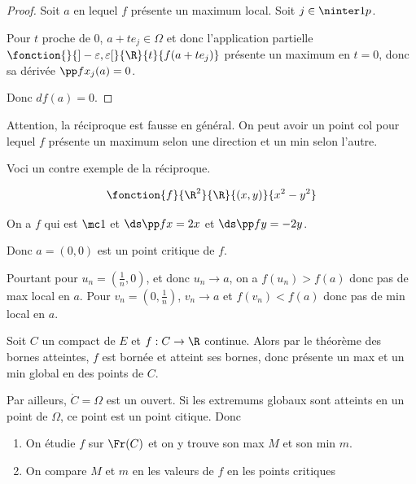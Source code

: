 \begin{proof}
    Soit $a$ en lequel $f$ présente un maximum local. Soit $j \in \ninter 1 p$. 

    Pour $t$ proche de 0, $a + t e_j \in \Omega$ et donc l'application
    partielle $\fonction{}{]- \varepsilon, \varepsilon[}{\R}{t}{f(a + t e_j)}$ présente un maximum en $t = 0$, donc
    sa dérivée $\pp f {x_j} (a) = 0$.

    Donc $df(a) = 0$.
\end{proof}

Attention, la réciproque est fausse en général. On peut avoir un point col pour 
lequel $f$ présente un maximum selon une direction et un min selon l'autre. 


\begin{exemple}
    Voci un contre exemple de la réciproque. 

    $$\fonction{f}{\R^2}{\R}{(x, y)}{x^2 - y^2}$$
    
    On a $f$ qui est $\mc 1$ et 
    $\ds \pp f x = 2x$ et $\ds \pp f y = -2y$.

    Donc $a = (0, 0)$ est un point critique de $f$.

    Pourtant pour $u_n = \left( \frac 1 n, 0 \right)$, et donc $u_n \to a$, on a 
    $f(u_n) > f(a)$ donc pas de max local en $a$. Pour $v_n = \left( 0, \frac 1 n \right)$,
    $v_n \to a$ et $f(v_n) < f(a)$ donc pas de min local en $a$.
\end{exemple}


Soit $C$ un compact de $E$ et $f : C \to \R$ continue. Alors par le théorème des bornes atteintes, 
$f$ est bornée et atteint ses bornes, donc présente un max et un min global en des points de $C$. 

Par ailleurs, $\mathring C = \Omega$ est un ouvert. Si les extremums globaux sont atteints en un point 
de $\Omega$, ce point est un point citique. Donc 
\begin{enumerate}
    \item On étudie $f$ sur $\Fr(C)$ et on y trouve son max $M$ et son min $m$.
    \item On compare $M$ et $m$ en les valeurs de $f$ en les points critiques
\end{enumerate}

